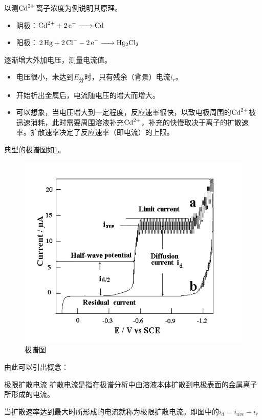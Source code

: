 \begin{example}
	以测$\ce{Cd^2+}$离子浓度为例说明其原理。
	
	\begin{itemize}
		\item 阴极：$\ce{Cd^2+ + 2e- -> Cd}$
		\item 阳极：$\ce{2Hg + 2Cl- - 2e- -> Hg2Cl2}$
	\end{itemize}

	逐渐增大外加电压，测量电流值。
	
	\begin{itemize}
		\item 电压很小，未达到$E_{\text{分}}$时，只有残余（背景）电流$i_r$。
		\item 开始析出金属后，电流随电压的增大而增大。
		\item 可以想象，当电压增大到一定程度，反应速率很快，以致电极周围的$\ce{Cd^2+}$被迅速消耗，此时需要周围溶液补充$\ce{Cd^2+}$，补充的快慢取决于离子的扩散速率。扩散速率决定了反应速率（即电流）的上限。
	\end{itemize}

	典型的极谱图如\ref{fig:chp7jipufenxiivfigure}。
\end{example}

\begin{figure}[!h]
	\centering
	\includegraphics[width=0.7\linewidth]{image/chp7_jipufenxi_IVfigure}
	\caption{极谱图}
	\label{fig:chp7jipufenxiivfigure}
\end{figure}

由此可以引出概念：

\begin{definition*}{极限扩散电流}{}
	扩散电流是指在极谱分析中由溶液本体扩散到电极表面的金属离子所形成的电流。
	
	当扩散速率达到最大时所形成的电流就称为极限扩散电流。即图中的$i_d=i_{ave}-i_r$
\end{definition*}

